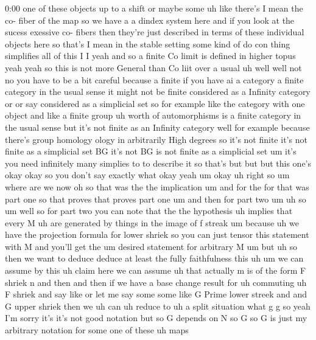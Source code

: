 \begin{unfinished}{0:00}
one  of  these  objects  up  to  a  shift  or
maybe  some  uh
like
there's  I  mean  the  co-  fiber  of  the  map
so  we  have  a  a  dindex  system  here  and  if
you  look  at  the  sucess  exessive  co-
fibers  then  they're  just  described  in
terms  of  these  individual  objects  here
so  that's  I  mean  in  the  stable  setting
some  kind  of  do  con  thing  simplifies  all
of  this  I
I  yeah  and  so  a  finite  Co  limit  is
defined  in  higher  topus  yeah  yeah  so
this  is  not  more  General  than  Co  liit
over  a
usual  uh  well  well  not  no  you  have  to  be
a  bit  careful  because  a  finite  if  you
have  ai  a  category  a  finite  category  in
the  usual  sense  it  might  not  be  finite
considered  as  a  Infinity  category  or  or
say  considered  as  a  simplicial  set  so
for  example  like  the  category  with  one
object  and  like  a  finite
group  uh  worth  of  automorphisms  is  a
finite  category  in  the  usual  sense  but
it's  not  finite  as  an  Infinity
category  well  for  example  because
there's  group  homology  ology  in
arbitrarily  High  degrees  so  it's  not
finite  it's  not  finite  as  a  simplicial
set  BG  it's  not  BG  is  not  finite  as  a
simplicial
set  um  it's  you  need  infinitely  many
simplies  to  to  describe  it
so  that's  but
but  but  this  one's  okay  okay  so  you
don't  say  exactly  what  okay
yeah
um
okay  uh  right
so  um  where  are  we  now  oh  so  that  was
the  the
implication  um  and  for  the  for  that  was
part  one  so  that
proves
that  proves  part
one  um  and  then  for  part  two
um
uh  so
um  well  so  for  part  two  you  can  note
that  the  the  hypothesis
uh  implies  that  every
M  uh  are  generated  by  things  in  the
image  of  f
streak  um  because  uh  we  have  the
projection  formula  for  lower  shriek  so
you  can  just  tensor  this  statement  with
M  and  you'll  get  the  um  desired
statement  for  arbitrary
M  um  but  uh  so  then  we  want  to  deduce
deduce  at  least  the  fully  faithfulness
this
uh  um  we  can
assume  by  this  uh  claim  here  we  can
assume  uh  that  actually  m  is  of  the  form
F  shriek
n  and  then  and  then  if  we  have
a  base  change
result  for  uh
commuting  uh  F  shriek  and  say
like  or  let  me  say  some  some  like  G
Prime  lower  streek  and  and  G  upper
shriek  then  we  uh  can  uh  reduce
to
uh  a  split  situation
what  g  g  so  yeah  I'm  sorry  it's  it's  not
good  notation  but  so  G  depends  on
N  so  G  so  G  is  just  my  arbitrary
notation  for  some  one  of  these  uh  maps

\end{unfinished}
